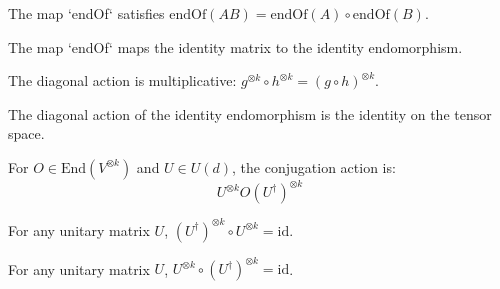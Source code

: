\begin{theorem}\label{thm:endOf_mul}
  \leanok
  The map `endOf` satisfies $\text{endOf}(A B) = \text{endOf}(A) \circ \text{endOf}(B)$.
\end{theorem}

\begin{theorem}\label{thm:endOf_one}
  \leanok
  The map `endOf` maps the identity matrix to the identity endomorphism.
\end{theorem}

\begin{theorem}\label{thm:diagAction_comp}
  \leanok
  The diagonal action is multiplicative: $g^{\otimes k} \circ h^{\otimes k} = (g \circ h)^{\otimes k}$.
\end{theorem}

\begin{theorem}\label{thm:diagAction_id}
  \leanok
  The diagonal action of the identity endomorphism is the identity on the tensor space.
\end{theorem}

\begin{definition}\label{def:actOn}
  \leanok
  For $O \in \text{End}(V^{\otimes k})$ and $U \in U(d)$, the conjugation action is:
  \begin{equation}
    U^{\otimes k} O (U^\dagger)^{\otimes k}
  \end{equation}
\end{definition}

\begin{theorem}\label{thm:diagAction_endOf_unitary_left}
  \leanok
  For any unitary matrix $U$, $(U^\dagger)^{\otimes k} \circ U^{\otimes k} = \text{id}$.
\end{theorem}

\begin{theorem}\label{thm:diagAction_endOf_unitary_right}
  \leanok
  For any unitary matrix $U$, $U^{\otimes k} \circ (U^\dagger)^{\otimes k} = \text{id}$.
\end{theorem}

